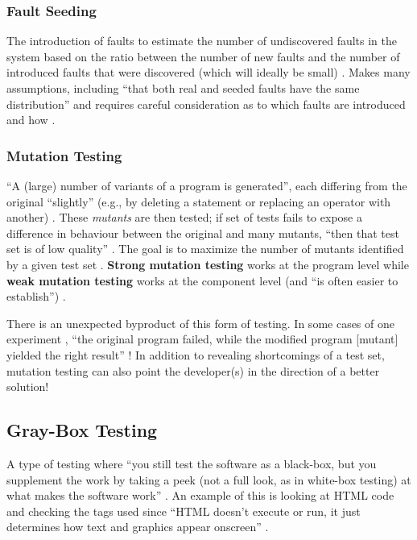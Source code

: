 \subsubsection{Fault Seeding \citep[pp.~427-428]{vanVliet2000}}

The introduction of faults to estimate the number of undiscovered faults in the
system based on the ratio between the number of new faults and the number of
introduced faults that were discovered (which will ideally be small)
\citep[p.~427]{vanVliet2000}. Makes many assumptions, including
``that both real and seeded faults have the same distribution'' and requires
careful consideration as to which faults are introduced and how
\citep[p.~427]{vanVliet2000}.

\subsubsection{Mutation Testing \citep[pp.~428-429]{vanVliet2000}}
\label{chap:notes:sec:mutation-testing}

``A (large) number of variants of a program is generated'', each differing from
the original ``slightly'' (e.g., by deleting a statement or replacing an
operator with another) \citep[p.~428]{vanVliet2000}. These
\emph{mutants} are then tested; if set of tests fails to expose a difference in
behaviour between the original and many mutants, ``then that test set is of low
quality'' \citep[pp.~428-429]{vanVliet2000}. The goal is to maximize
the number of mutants identified by a given test set
\citep[p.~429]{vanVliet2000}. \textbf{Strong mutation testing} works
at the program level while \textbf{weak mutation testing} works at the
component level (and ``is often easier to establish'')
\citep[p.~429]{vanVliet2000}.

There is an unexpected byproduct of this form of testing. In some cases of one
experiment , ``the original program failed,
while the modified program [mutant] yielded the right result''
\citep[p.~432]{vanVliet2000}! In addition to revealing shortcomings
of a test set, mutation testing can also point the developer(s) in the
direction of a better solution!

\subsection{Gray-Box Testing \citep[pp.~218-220]{Patton2006}}
A type of testing where ``you still test the software as a black-box, but you
supplement the work by taking a peek (not a full look, as in white-box testing)
at what makes the software work'' \citep[p.~218]{Patton2006}. An
example of this is looking at HTML code and checking the tags used since
``HTML doesn't execute or run, it just determines how text and graphics appear
onscreen'' \citep[p.~220]{Patton2006}.

